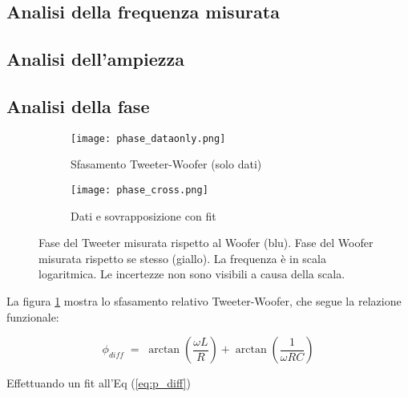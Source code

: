 \documentclass[../Relazione_circuiti]{subfiles}
\begin{document}
\subsection{Analisi della frequenza misurata}

\subsection{Analisi dell'ampiezza}

\subsection{Analisi della fase}

\begin{figure}[H]
\centering

\begin{subfigure}{=0.5\textwidth}
\centering
\texttt{[image: phase\_dataonly.png]}

\caption{Sfasamento Tweeter-Woofer (solo dati)}
\label{fig: pdiff_dataonly}

\end{subfigure}

\begin{subfigure}{=0.5\textwidth}
\centering
\texttt{[image: phase\_cross.png]}

\caption{Dati e sovrapposizione con fit}
\label{fig: pdiff_fit_data}

\end{subfigure}

\caption{Fase del Tweeter misurata rispetto al Woofer (blu). Fase del Woofer  misurata rispetto se stesso (giallo). La frequenza è in scala logaritmica. Le incertezze non sono visibili a causa della scala.}
\label{fig: phase_diff}

\end{figure}

La figura \ref{fig: pdiff_dataonly} mostra lo sfasamento relativo Tweeter-Woofer, che segue la relazione funzionale:

  \begin{equation}
    \label{eq:p_diff}
    \phi_{diff} \; = \; \arctan(\frac{\omega L}{R}) + \arctan(\frac{1}{\omega RC})
  \end{equation}


  
Effettuando un fit all'Eq (\ref{eq:p_diff})
\end{document}
